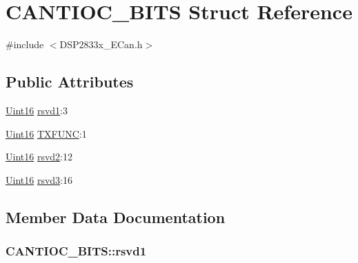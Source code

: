 \hypertarget{struct_c_a_n_t_i_o_c___b_i_t_s}{}\section{C\+A\+N\+T\+I\+O\+C\+\_\+\+B\+I\+T\+S Struct Reference}
\label{struct_c_a_n_t_i_o_c___b_i_t_s}


{\ttfamily \#include $<$D\+S\+P2833x\+\_\+\+E\+Can.\+h$>$}

\subsection*{Public Attributes}
\begin{DoxyCompactItemize}
\item 
\hyperlink{_d_s_p2833x___device_8h_a59a9f6be4562c327cbfb4f7e8e18f08b}{Uint16} \hyperlink{struct_c_a_n_t_i_o_c___b_i_t_s_a84138155837253be4661ceb251ef52ad}{rsvd1}\+:3
\item 
\hyperlink{_d_s_p2833x___device_8h_a59a9f6be4562c327cbfb4f7e8e18f08b}{Uint16} \hyperlink{struct_c_a_n_t_i_o_c___b_i_t_s_a04c3a3381e8d68dea3a1c6188cfd16fb}{T\+X\+F\+U\+N\+C}\+:1
\item 
\hyperlink{_d_s_p2833x___device_8h_a59a9f6be4562c327cbfb4f7e8e18f08b}{Uint16} \hyperlink{struct_c_a_n_t_i_o_c___b_i_t_s_ab5a9b1d36c7c21760855c2156fc1b99a}{rsvd2}\+:12
\item 
\hyperlink{_d_s_p2833x___device_8h_a59a9f6be4562c327cbfb4f7e8e18f08b}{Uint16} \hyperlink{struct_c_a_n_t_i_o_c___b_i_t_s_a157f1e93a4e54a12988c59ad06c300e9}{rsvd3}\+:16
\end{DoxyCompactItemize}


\subsection{Member Data Documentation}
\hypertarget{struct_c_a_n_t_i_o_c___b_i_t_s_a84138155837253be4661ceb251ef52ad}{}
\subsubsection[{rsvd1}]{ C\+A\+N\+T\+I\+O\+C\+\_\+\+B\+I\+T\+S\+::rsvd1}\label{struct_c_a_n_t_i_o_c___b_i_t_s_a84138155837253be4661ceb251ef52ad}
\hypertarget{struct_c_a_n_t_i_o_c___b_i_t_s_ab5a9b1d36c7c21760855c2156fc1b99a}{}
